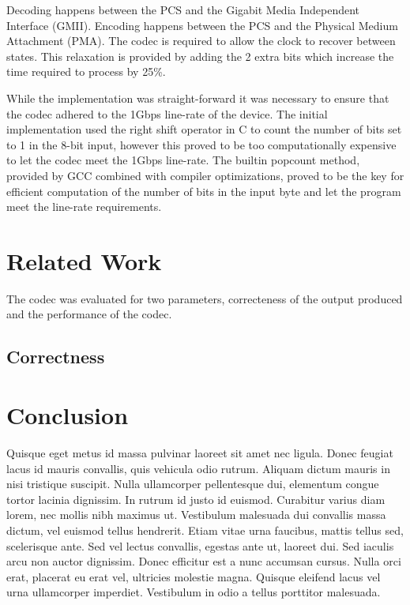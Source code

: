 \documentclass[conference]{IEEEtran}
\begin{document}
Decoding happens between the PCS and the Gigabit Media Independent Interface (GMII). Encoding happens between the PCS and the Physical Medium  Attachment (PMA). The codec is required to allow the clock to recover between states. This relaxation is provided by adding the 2 extra bits which increase the time required to process by 25\%.

While the implementation was straight-forward it was necessary to ensure that the codec adhered to the 1Gbps line-rate of the device. The initial implementation used the right shift operator in C to count the number of bits set to 1 in the 8-bit input, however this proved to be too computationally expensive to let the codec meet the 1Gbps line-rate. The builtin popcount method, provided by GCC combined with compiler optimizations, proved to be the key for efficient computation of the number of bits in the input byte and let the program meet the line-rate requirements.

\section{Related Work}

The codec was evaluated for two parameters, correcteness of the output produced and the performance of the codec.

\subsection{Correctness}



\section{Conclusion}

Quisque eget metus id massa pulvinar laoreet sit amet nec ligula. Donec feugiat lacus id mauris convallis, quis vehicula odio rutrum. Aliquam dictum mauris in nisi tristique suscipit. Nulla ullamcorper pellentesque dui, elementum congue tortor lacinia dignissim. In rutrum id justo id euismod. Curabitur varius diam lorem, nec mollis nibh maximus ut. Vestibulum malesuada dui convallis massa dictum, vel euismod tellus hendrerit. Etiam vitae urna faucibus, mattis tellus sed, scelerisque ante. Sed vel lectus convallis, egestas ante ut, laoreet dui. Sed iaculis arcu non auctor dignissim. Donec efficitur est a nunc accumsan cursus. Nulla orci erat, placerat eu erat vel, ultricies molestie magna. Quisque eleifend lacus vel urna ullamcorper imperdiet. Vestibulum in odio a tellus porttitor malesuada.



\end{document}
